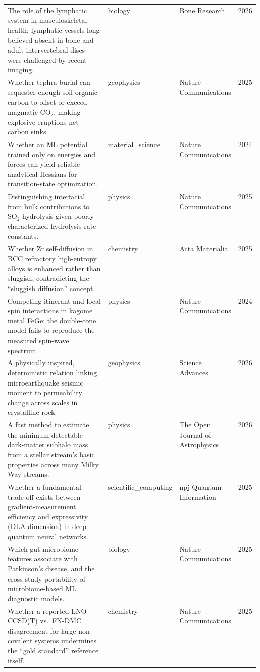 \begin{landscape}
\begin{longtable}{@{}p{0.58\linewidth} l l c@{}}
The role of the lymphatic system in musculoskeletal health: lymphatic vessels long believed absent in bone and adult intervertebral discs were challenged by recent imaging. & biology & Bone Research & 2026 \\
\addlinespace
Whether tephra burial can sequester enough soil organic carbon to offset or exceed magmatic CO$_2$, making explosive eruptions net carbon sinks. & geophysics & Nature Communications & 2025 \\
\addlinespace
Whether an ML potential trained only on energies and forces can yield reliable analytical Hessians for transition-state optimization. & material\_science & Nature Communications & 2024 \\
\addlinespace
Distinguishing interfacial from bulk contributions to SO$_2$ hydrolysis given poorly characterized hydrolysis rate constants. & physics & Nature Communications & 2025 \\
\addlinespace
Whether Zr self-diffusion in BCC refractory high-entropy alloys is enhanced rather than sluggish, contradicting the ``sluggish diffusion'' concept. & chemistry & Acta Materialia & 2025 \\
\addlinespace
Competing itinerant and local spin interactions in kagome metal FeGe: the double-cone model fails to reproduce the measured spin-wave spectrum. & physics & Nature Communications & 2024 \\
\addlinespace
A physically inspired, deterministic relation linking microearthquake seismic moment to permeability change across scales in crystalline rock. & geophysics & Science Advances & 2026 \\
\addlinespace
A fast method to estimate the minimum detectable dark-matter subhalo mass from a stellar stream's basic properties across many Milky Way streams. & physics & The Open Journal of Astrophysics & 2026 \\
\addlinespace
Whether a fundamental trade-off exists between gradient-measurement efficiency and expressivity (DLA dimension) in deep quantum neural networks. & scientific\_computing & npj Quantum Information & 2025 \\
\addlinespace
Which gut microbiome features associate with Parkinson's disease, and the cross-study portability of microbiome-based ML diagnostic models. & biology & Nature Communications & 2025 \\
\addlinespace
Whether a reported LNO-CCSD(T) vs.\ FN-DMC disagreement for large non-covalent systems undermines the ``gold standard'' reference itself. & chemistry & Nature Communications & 2025 \\

\end{longtable}
\end{landscape}

